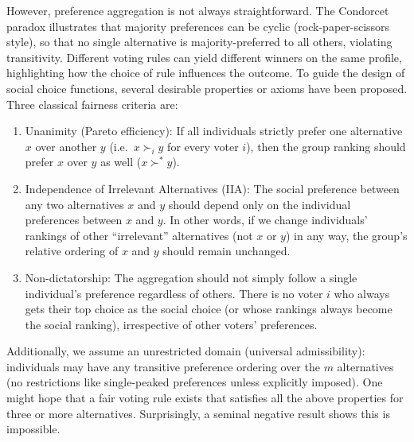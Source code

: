 \documentclass[
  letterpaper,
  numbers=noenddot,
  DIV=11]{scrreprt}
\providecommand{\tightlist}{%
  \setlength{\itemsep}{0pt}\setlength{\parskip}{0pt}}\usepackage{longtable,booktabs,array}
\theoremstyle{plain}
\theoremstyle{definition}
\theoremstyle{remark}
\begin{document}
However, preference aggregation is not always straightforward. The
Condorcet paradox illustrates that majority preferences can be cyclic
(rock-paper-scissors style), so that no single alternative is
majority-preferred to all others, violating transitivity. Different
voting rules can yield different winners on the same profile,
highlighting how the choice of rule influences the outcome. To guide the
design of social choice functions, several desirable properties or
axioms have been proposed. Three classical fairness criteria are:

\begin{enumerate}
\def\labelenumi{\arabic{enumi}.}
\tightlist
\item
  Unanimity (Pareto efficiency): If all individuals strictly prefer one
  alternative \(x\) over another \(y\) (i.e.~\(x \succ_i y\) for every
  voter \(i\)), then the group ranking should prefer \(x\) over \(y\) as
  well (\(x \succ^* y\)).
\item
  Independence of Irrelevant Alternatives (IIA): The social preference
  between any two alternatives \(x\) and \(y\) should depend only on the
  individual preferences between \(x\) and \(y\). In other words, if we
  change individuals' rankings of other ``irrelevant'' alternatives (not
  \(x\) or \(y\)) in any way, the group's relative ordering of \(x\) and
  \(y\) should remain unchanged.
\item
  Non-dictatorship: The aggregation should not simply follow a single
  individual's preference regardless of others. There is no voter \(i\)
  who always gets their top choice as the social choice (or whose
  rankings always become the social ranking), irrespective of other
  voters' preferences.
\end{enumerate}

Additionally, we assume an unrestricted domain (universal
admissibility): individuals may have any transitive preference ordering
over the \(m\) alternatives (no restrictions like single-peaked
preferences unless explicitly imposed). One might hope that a fair
voting rule exists that satisfies all the above properties for three or
more alternatives. Surprisingly, a seminal negative result shows this is
impossible.
\end{document}
